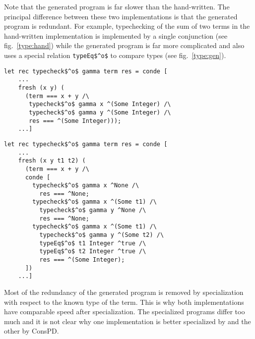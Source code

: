 Note that the generated program is far slower than the hand-written.
The principal difference between these two implementations is that the generated program is redundant.
For example, typechecking of the sum of two terms in the hand-written implementation is implemented by a single conjunction (see fig.~\ref{type:hand}) while the generated program is far more complicated and also uses a special relation \lstinline{typeEq$^o$} to compare types (see fig.~\ref{type:gen}).


\begin{figure*}[!h]
  \centering
  \begin{minipage}{0.95\textwidth}
    \begin{lstlisting}[label={type:hand}, caption={A fragment of hand-written typechecker}, captionpos=b, frame=tb]
  let rec typecheck$^o$ gamma term res = conde [
    ...
    fresh (x y) (
      (term === x + y /\
       typecheck$^o$ gamma x ^(Some Integer) /\
       typecheck$^o$ gamma y ^(Some Integer) /\
       res === ^(Some Integer)));
    ...]
    \end{lstlisting}
  \end{minipage}
\end{figure*}


\begin{figure*}[!h]
  \centering
  \begin{minipage}{0.95\textwidth}
    \begin{lstlisting}[label={type:gen}, caption={A fragment of generated typechecker}, captionpos=b, frame=tb]
  let rec typecheck$^o$ gamma term res = conde [
    ...
    fresh (x y t1 t2) (
      (term === x + y /\
      conde [
        typecheck$^o$ gamma x ^None /\
          res === ^None;
        typecheck$^o$ gamma x ^(Some t1) /\
          typecheck$^o$ gamma y ^None /\
          res === ^None;
        typecheck$^o$ gamma x ^(Some t1) /\
          typecheck$^o$ gamma y ^(Some t2) /\
          typeEq$^o$ t1 Integer ^true /\
          typeEq$^o$ t2 Integer ^true /\
          res === ^(Some Integer);
      ])
    ...]
    \end{lstlisting}
  \end{minipage}
\end{figure*}

Most of the redundancy of the generated program is removed by specialization with respect to the known type of the term.
This is why both implementations have comparable speed after specialization.
The specialized programs differ too much and it is not clear why one implementation is better specialized by \ecce and the other by ConsPD.
